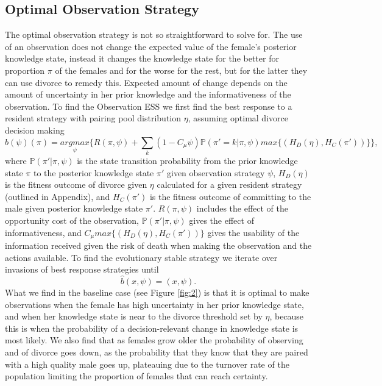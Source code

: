 \documentclass[10pt]{article}
\begin{document}
\subsection{Optimal Observation Strategy}

The optimal observation strategy is not so straightforward to solve for. The use of an observation does not change the expected value of the female's posterior knowledge state, instead it changes the knowledge state for the better for proportion $\pi$ of the females and for the worse for the rest, but for the latter they can use divorce to remedy this. Expected amount of change depends on the amount of uncertainty in her prior knowledge and the informativeness of the observation. To find the Observation ESS we first find the best response to a resident strategy with pairing pool distribution $\eta$, assuming optimal divorce decision making 
\begin{equation}
	\hat{b}(\psi)(\pi)=\underset{\psi}{argmax}\{R(\pi,\psi)+\underset{k}{\sum}(1-C_{\mu}\psi)\mathbb{P}(\pi'=k|\pi,\psi)\underset{}{max}\{(H_{D}(\eta),H_{C}(\pi'))\}\}, \label{eq:26-1}	
\end{equation}
where $\mathbb{P}(\pi'|\pi,\psi)$ is the state transition probability from the prior knowledge state $\pi$ to the posterior knowledge state $\pi'$ given observation strategy $\psi$, $H_{D}(\eta)$ is the fitness outcome of divorce given $\eta$ calculated for a given resident strategy (outlined in Appendix), and $H_{C}(\pi')$ is the fitness outcome of committing to the male given posterior knowledge state $\pi'$. $R(\pi,\psi)$ includes the effect of the opportunity cost of the observation, $\mathbb{P}(\pi'|\pi,\psi)$ gives the effect of informativeness, and $C_\mu \underset{}{max}\{(H_{D}(\eta),H_{C}(\pi'))\}$ gives the usability of the information received given the risk of death when making the observation and the actions available.
To find the evolutionary stable strategy we iterate over invasions of best response strategies until
\begin{equation}
	\hat{b}(x,\psi)=(x,\psi).\label{eq:26}
\end{equation}
What we find in the baseline case (see Figure \ref{fig:2}) is that it is optimal to make observations when the female has high uncertainty in her prior knowledge state, and when her knowledge state is near to the divorce threshold set by $\eta$, because this is when the probability of a decision-relevant change in knowledge state is most likely. We also find that as females grow older the probability of observing and of divorce goes down, as the probability that they know that they are paired with a high quality male goes up, plateauing due to the turnover rate of the population limiting the proportion of females that can reach certainty.
\end{document}
